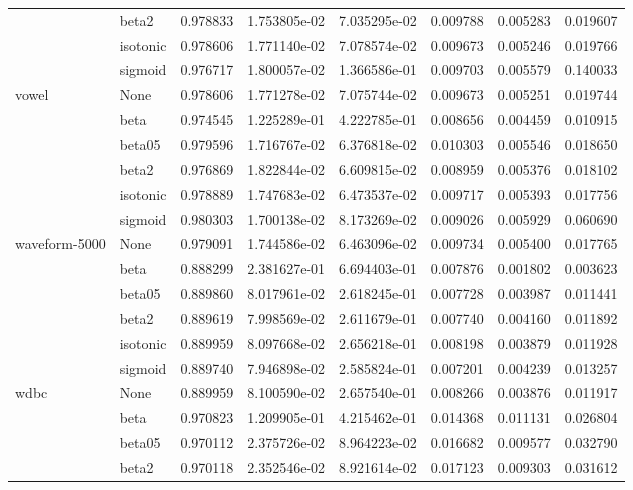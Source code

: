 \begin{tabular}{llrrrrrr}
        & beta2 &  0.978833 &  1.753805e-02 &  7.035295e-02 &  0.009788 &  0.005283 &  0.019607 \\
        & isotonic &  0.978606 &  1.771140e-02 &  7.078574e-02 &  0.009673 &  0.005246 &  0.019766 \\
        & sigmoid &  0.976717 &  1.800057e-02 &  1.366586e-01 &  0.009703 &  0.005579 &  0.140033 \\
vowel & None &  0.978606 &  1.771278e-02 &  7.075744e-02 &  0.009673 &  0.005251 &  0.019744 \\
        & beta &  0.974545 &  1.225289e-01 &  4.222785e-01 &  0.008656 &  0.004459 &  0.010915 \\
        & beta05 &  0.979596 &  1.716767e-02 &  6.376818e-02 &  0.010303 &  0.005546 &  0.018650 \\
        & beta2 &  0.976869 &  1.822844e-02 &  6.609815e-02 &  0.008959 &  0.005376 &  0.018102 \\
        & isotonic &  0.978889 &  1.747683e-02 &  6.473537e-02 &  0.009717 &  0.005393 &  0.017756 \\
        & sigmoid &  0.980303 &  1.700138e-02 &  8.173269e-02 &  0.009026 &  0.005929 &  0.060690 \\
waveform-5000 & None &  0.979091 &  1.744586e-02 &  6.463096e-02 &  0.009734 &  0.005400 &  0.017765 \\
        & beta &  0.888299 &  2.381627e-01 &  6.694403e-01 &  0.007876 &  0.001802 &  0.003623 \\
        & beta05 &  0.889860 &  8.017961e-02 &  2.618245e-01 &  0.007728 &  0.003987 &  0.011441 \\
        & beta2 &  0.889619 &  7.998569e-02 &  2.611679e-01 &  0.007740 &  0.004160 &  0.011892 \\
        & isotonic &  0.889959 &  8.097668e-02 &  2.656218e-01 &  0.008198 &  0.003879 &  0.011928 \\
        & sigmoid &  0.889740 &  7.946898e-02 &  2.585824e-01 &  0.007201 &  0.004239 &  0.013257 \\
wdbc & None &  0.889959 &  8.100590e-02 &  2.657540e-01 &  0.008266 &  0.003876 &  0.011917 \\
        & beta &  0.970823 &  1.209905e-01 &  4.215462e-01 &  0.014368 &  0.011131 &  0.026804 \\
        & beta05 &  0.970112 &  2.375726e-02 &  8.964223e-02 &  0.016682 &  0.009577 &  0.032790 \\
        & beta2 &  0.970118 &  2.352546e-02 &  8.921614e-02 &  0.017123 &  0.009303 &  0.031612 \\

\end{tabular}
